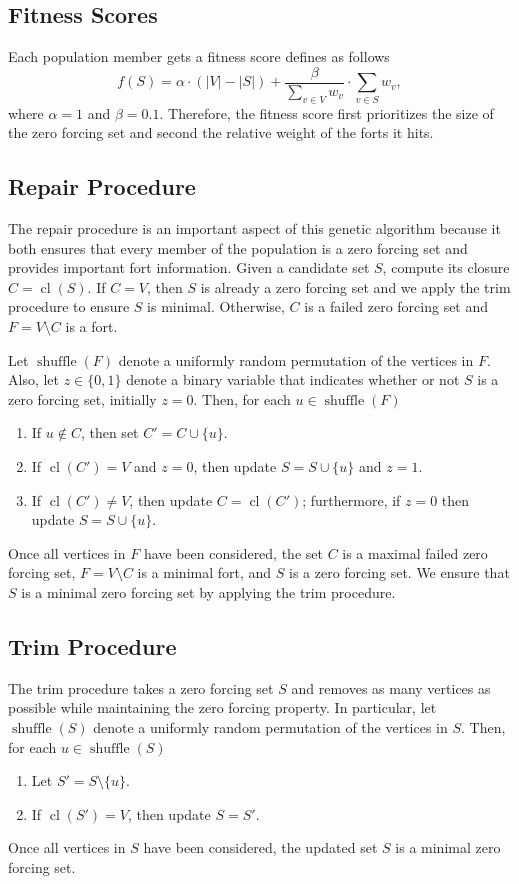 \documentclass[11pt]{article}
\newcommand\abs[1]{\left|#1\right|}
\newcommand\cl[1]{\operatorname{cl}\left(#1\right)}
\newcommand\shuffle[1]{\operatorname{shuffle}\left(#1\right)}
\begin{document}
\subsection{Fitness Scores}
Each population member gets a fitness score defines as follows
\[
f(S) = \alpha\cdot\left(\abs{V}-\abs{S}\right) + \frac{\beta}{\sum_{v\in V}w_{v}}\cdot\sum_{v\in S}w_{v},
\]
where $\alpha=1$ and $\beta=0.1$. 
Therefore, the fitness score first prioritizes the size of the zero forcing set and second the relative weight of the forts it hits. 

\subsection{Repair Procedure}
The repair procedure is an important aspect of this genetic algorithm because it both ensures that every member of the population is a zero forcing set and provides important fort information.
Given a candidate set $S$, compute its closure $C=\cl{S}$.
If $C=V$, then $S$ is already a zero forcing set and we apply the trim procedure to ensure $S$ is minimal.
Otherwise, $C$ is a failed zero forcing set and $F=V\setminus C$ is a fort.

Let $\shuffle{F}$ denote a uniformly random permutation of the vertices in $F$.
Also, let $z\in\{0,1\}$ denote a binary variable that indicates whether or not $S$ is a zero forcing set, initially $z=0$. 
Then, for each $u\in\shuffle{F}$
\begin{enumerate}
\item If $u\notin C$, then set $C' = C\cup\{u\}$. 

\item If $\cl{C'}= V$ and $z=0$, then update $S=S\cup\{u\}$ and $z=1$.

\item If $\cl{C'}\neq V$, then update $C=\cl{C'}$; furthermore, if $z=0$ then update $S=S\cup\{u\}$.
\end{enumerate}
Once all vertices in $F$ have been considered, the set $C$ is a maximal failed zero forcing set, $F=V\setminus C$ is a minimal fort, and $S$ is a zero forcing set.
We ensure that $S$ is a minimal zero forcing set by applying the trim procedure. 

\subsection{Trim Procedure}
The trim procedure takes a zero forcing set $S$ and removes as many vertices as possible while maintaining the zero forcing property. 
In particular, let $\shuffle{S}$ denote a uniformly random permutation of the vertices in $S$.
Then, for each $u\in\shuffle{S}$
\begin{enumerate}
\item Let $S'=S\setminus\{u\}$.

\item If $\cl{S'}=V$, then update $S=S'$. 
\end{enumerate}
Once all vertices in $S$ have been considered, the updated set $S$ is a minimal zero forcing set. 
\end{document}
